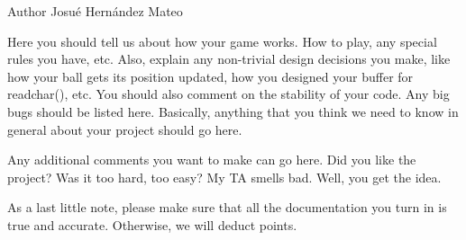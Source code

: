 \begin{DoxyAuthor}{Author}
Josué Hernández Mateo
\end{DoxyAuthor}
Here you should tell us about how your game works. How to play, any special rules you have, etc. Also, explain any non-\/trivial design decisions you make, like how your ball gets its position updated, how you designed your buffer for readchar(), etc. You should also comment on the stability of your code. Any big bugs should be listed here. Basically, anything that you think we need to know in general about your project should go here.

Any additional comments you want to make can go here. Did you like the project? Was it too hard, too easy? My TA smells bad. Well, you get the idea.

As a last little note, please make sure that all the documentation you turn in is true and accurate. Otherwise, we will deduct points. 